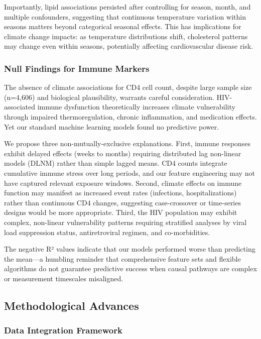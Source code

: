 Importantly, lipid associations persisted after controlling for season, month, and multiple confounders, suggesting that continuous temperature variation within seasons matters beyond categorical seasonal effects. This has implications for climate change impacts: as temperature distributions shift, cholesterol patterns may change even within seasons, potentially affecting cardiovascular disease risk.

\subsubsection{Null Findings for Immune Markers}

The absence of climate associations for CD4 cell count, despite large sample size (n=4,606) and biological plausibility, warrants careful consideration. HIV-associated immune dysfunction theoretically increases climate vulnerability through impaired thermoregulation, chronic inflammation, and medication effects. Yet our standard machine learning models found no predictive power.

We propose three non-mutually-exclusive explanations. First, immune responses exhibit delayed effects (weeks to months) requiring distributed lag non-linear models (DLNM) rather than simple lagged means. CD4 counts integrate cumulative immune stress over long periods, and our feature engineering may not have captured relevant exposure windows. Second, climate effects on immune function may manifest as increased event rates (infections, hospitalizations) rather than continuous CD4 changes, suggesting case-crossover or time-series designs would be more appropriate. Third, the HIV population may exhibit complex, non-linear vulnerability patterns requiring stratified analyses by viral load suppression status, antiretroviral regimen, and co-morbidities.

The negative R² values indicate that our models performed worse than predicting the mean---a humbling reminder that comprehensive feature sets and flexible algorithms do not guarantee predictive success when causal pathways are complex or measurement timescales misaligned.

\subsection{Methodological Advances}

\subsubsection{Data Integration Framework}

